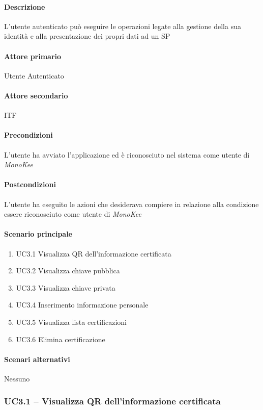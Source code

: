 \paragraph{Descrizione}  L’utente autenticato può eseguire le operazioni legate alla gestione della sua identità e alla presentazione dei propri dati ad un SP
\paragraph{Attore primario}  Utente Autenticato
\paragraph{Attore secondario}  ITF
\paragraph{Precondizioni}  L’utente ha avviato l’applicazione ed è riconosciuto nel sistema come utente di \textit{MonoKee}
\paragraph{Postcondizioni}  L’utente ha eseguito le azioni che desiderava compiere in relazione alla condizione essere riconosciuto come utente di \textit{MonoKee}
\paragraph{Scenario principale}  
    \begin{enumerate}
        \item UC3.1 Visualizza QR dell’informazione certificata
        \item UC3.2 Visualizza chiave pubblica
        \item UC3.3 Visualizza chiave privata
        \item UC3.4 Inserimento informazione personale
        \item UC3.5 Visualizza lista certificazioni
        \item UC3.6 Elimina certificazione
    \end{enumerate}
\paragraph{Scenari alternativi}  Nessuno





\subsubsection{UC3.1 – Visualizza QR dell’informazione certificata}
